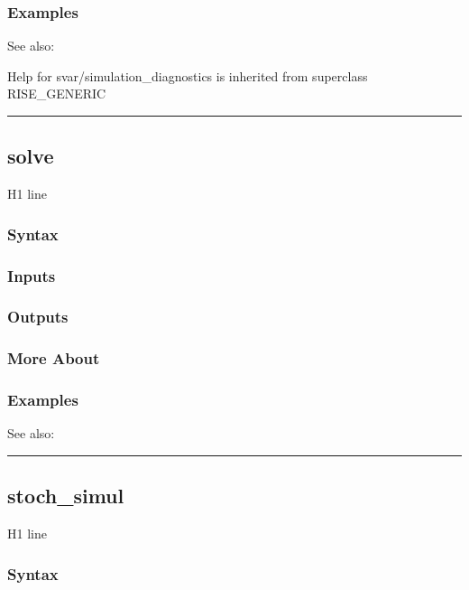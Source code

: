 \documentclass[letterpaper,10pt,english]{sphinxmanual}
\begin{document}
\subsubsection{Examples}
\label{classes/models/@svar/svar:id120}
See also:

Help for svar/simulation\_diagnostics is inherited from superclass RISE\_GENERIC


\bigskip\hrule{}\bigskip



\subsection{solve}
\label{classes/models/@svar/svar:solve}\label{classes/models/@svar/svar:id121}
H1 line


\subsubsection{Syntax}
\label{classes/models/@svar/svar:id122}

\subsubsection{Inputs}
\label{classes/models/@svar/svar:id123}

\subsubsection{Outputs}
\label{classes/models/@svar/svar:id124}

\subsubsection{More About}
\label{classes/models/@svar/svar:id125}

\subsubsection{Examples}
\label{classes/models/@svar/svar:id126}
See also:


\bigskip\hrule{}\bigskip



\subsection{stoch\_simul}
\label{classes/models/@svar/svar:id127}\label{classes/models/@svar/svar:stoch-simul}
H1 line


\subsubsection{Syntax}
\label{classes/models/@svar/svar:id128}
\end{document}
